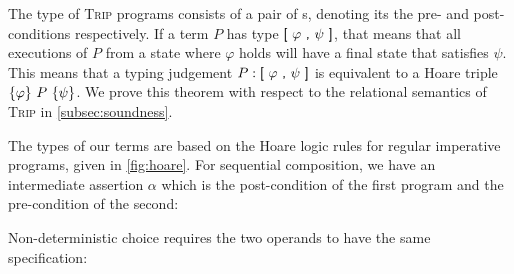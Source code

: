 \documentclass[sigplan]{acmart}%
\begin{document}
The type of \textsc{Trip} programs consists of a pair of s, 
denoting its the pre- and post-conditions respectively. If a term $P$ has type $\AgdaFunction{[}\ \varphi\ \AgdaFunction{,}\ \psi\ \AgdaFunction{]}$,
that means that all executions of $P$ from a state where $\varphi$ holds will have 
a final state that satisfies $\psi$. This means that a typing judgement $P :\AgdaFunction{[}\ \varphi\ \AgdaFunction{,}\ \psi\ \AgdaFunction{]}$ is 
equivalent to a Hoare triple $\{ \varphi \}\ P\ \{ \psi\}$. We prove this theorem with respect to the 
relational semantics of \textsc{Trip} in \autoref{subsec:soundness}.
\begin{code}
\>[2]\AgdaSpace{}%
\AgdaOperator{\AgdaDatatype{[\AgdaUnderscore{},\AgdaUnderscore{}]}}\AgdaSpace{}%
\AgdaSymbol{:}\AgdaSpace{}%
\AgdaSpace{}%
\AgdaSpace{}%
\AgdaSpace{}%
\AgdaSpace{}%
\AgdaSpace{}%
\<%
\end{code}
The types of our terms are based on the Hoare logic rules for regular imperative programs,
given in \autoref{fig:hoare}. For sequential composition, we have an intermediate assertion $\alpha$ which 
is the post-condition of the first program and the pre-condition of the second:
\begin{code}
\>[2][@{}l@{\AgdaIndent{0}}]%
\>[4]%
\>[10]\AgdaSymbol{:}\AgdaSpace{}%
\AgdaOperator{\AgdaDatatype{[}}\AgdaSpace{}%
\AgdaSpace{}%
\AgdaOperator{\AgdaDatatype{,}}\AgdaSpace{}%
\AgdaSpace{}%
\AgdaOperator{\AgdaDatatype{]}}\AgdaSpace{}%
\AgdaSpace{}%
\AgdaOperator{\AgdaDatatype{[}}\AgdaSpace{}%
\AgdaSpace{}%
\AgdaOperator{\AgdaDatatype{,}}\AgdaSpace{}%
\AgdaSpace{}%
\AgdaOperator{\AgdaDatatype{]}}\AgdaSpace{}%
\AgdaSpace{}%
\AgdaOperator{\AgdaDatatype{[}}\AgdaSpace{}%
\AgdaSpace{}%
\AgdaOperator{\AgdaDatatype{,}}\AgdaSpace{}%
\AgdaSpace{}%
\AgdaOperator{\AgdaDatatype{]}}\<%
\end{code}
Non-deterministic choice requires the two operands to have the same specification:
\begin{code}
\>[2][@{}l@{\AgdaIndent{0}}]%
\>[4]%
\>[10]\AgdaSymbol{:}\AgdaSpace{}%
\AgdaOperator{\AgdaDatatype{[}}\AgdaSpace{}%
\AgdaSpace{}%
\AgdaOperator{\AgdaDatatype{,}}\AgdaSpace{}%
\AgdaSpace{}%
\AgdaOperator{\AgdaDatatype{]}}\AgdaSpace{}%
\AgdaSpace{}%
\AgdaOperator{\AgdaDatatype{[}}\AgdaSpace{}%
\AgdaSpace{}%
\AgdaOperator{\AgdaDatatype{,}}\AgdaSpace{}%
\AgdaSpace{}%
\AgdaOperator{\AgdaDatatype{]}}\AgdaSpace{}%
\AgdaSpace{}%
\AgdaOperator{\AgdaDatatype{[}}\AgdaSpace{}%
\AgdaSpace{}%
\AgdaOperator{\AgdaDatatype{,}}\AgdaSpace{}%
\AgdaSpace{}%
\AgdaOperator{\AgdaDatatype{]}}\<%
\end{code}
\end{document}
